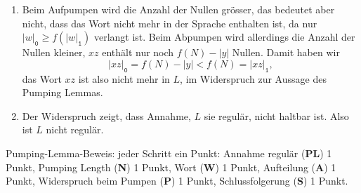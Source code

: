 \begin{loesung}
\begin{enumerate}
\begin{center}
\end{center}
\item Beim Aufpumpen wird die Anzahl der Nullen grösser, das bedeutet
aber nicht, dass das Wort nicht mehr in der Sprache enthalten ist,
da nur $|w|_{\texttt{0}} \ge f(|w|_{\texttt{1}})$ verlangt ist.
Beim Abpumpen wird allerdings die Anzahl der Nullen kleiner, $xz$ enthält
nur noch $f(N)-|y|$ Nullen.
Damit haben wir 
\[
|xz|_{\texttt{0}} = f(N)-|y| < f(N) = |xz|_{\texttt{1}},
\]
das Wort $xz$ ist also nicht mehr in $L$, im Widerspruch zur Aussage
des Pumping Lemmas.
\item Der Widerspruch zeigt, dass Annahme, $L$ sie regulär, nicht
haltbar ist.
Also ist $L$ nicht regulär.
\qedhere
\end{enumerate}
\end{loesung}

\begin{bewertung}
Pumping-Lemma-Beweis: jeder Schritt ein Punkt:
Annahme regulär ({\bf PL}) 1 Punkt,
Pumping Length ({\bf N}) 1 Punkt,
Wort ({\bf W}) 1 Punkt,
Aufteilung ({\bf A}) 1 Punkt,
Widerspruch beim Pumpen ({\bf P}) 1 Punkt,
Schlussfolgerung ({\bf S}) 1 Punkt.
\end{bewertung}
